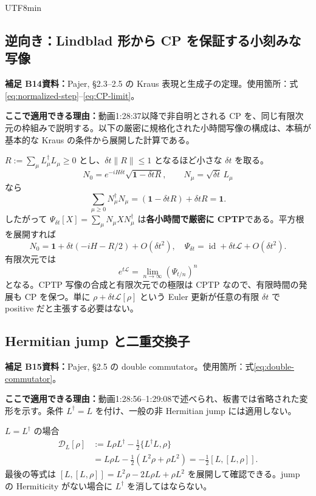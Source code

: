 \documentclass[11pt,a4paper]{article}
\numberwithin{equation}{section}
\newcommand{\id}{\operatorname{id}}
\newcommand{\I}{\mathbf{1}}
\newcommand{\D}[1]{\mathcal D_{#1}}
\newcommand{\supp}[3]{\par\smallskip\noindent\textcolor{BrickRed}{\textbf{補足 #1}}\quad\textbf{資料：}#2\par\noindent\textbf{ここで適用できる理由：}#3\par}
\begin{document}
\begin{CJK*}{UTF8}{min}
\subsection{逆向き：Lindblad 形から CP を保証する小刻みな写像}
\supp{B14}{Pajer\cite{pajer}, §2.3--2.5 の Kraus 表現と生成子の定理。使用箇所：式\eqref{eq:normalized-step}--\eqref{eq:CP-limit}。}{動画1:28:37以降で非自明とされる CP を、同じ有限次元の枠組みで説明する。以下の厳密に規格化された小時間写像の構成は、本稿が基本的な Kraus の条件から展開した計算である。}
$R:=\sum_\mu L_\mu^\dagger L_\mu\geq0$ とし、$\delta t\|R\|\leq1$ となるほど小さな $\delta t$ を取る。
\begin{equation}
N_0=e^{-iH\delta t}\sqrt{\I-\delta t R},
\qquad N_\mu=\sqrt{\delta t}\,L_\mu
\label{eq:normalized-step}
\end{equation}
なら
\begin{equation}
\sum_{\mu\geq0}N_\mu^\dagger N_\mu
=(\I-\delta t R)+\delta t R=\I.
\end{equation}
したがって $\Psi_{\delta t}[X]=\sum_\mu N_\mu XN_\mu^\dagger$ は\textbf{各小時間で厳密に CPTP}である。平方根を展開すれば
\begin{equation}
N_0=\I+\delta t(-iH-R/2)+O(\delta t^2),
\quad\Psi_{\delta t}=\id+\delta t\mathcal L+O(\delta t^2).
\end{equation}
有限次元では
\begin{equation}
e^{t\mathcal L}=\lim_{n\to\infty}(\Psi_{t/n})^n
\label{eq:CP-limit}
\end{equation}
となる。CPTP 写像の合成と有限次元での極限は CPTP なので、有限時間の発展も CP を保つ。単に $\rho+\delta t\mathcal L[\rho]$ という Euler 更新が任意の有限 $\delta t$ で positive だと主張する必要はない。

\subsection{Hermitian jump と二重交換子}
\supp{B15}{Pajer\cite{pajer}, §2.5 の double commutator。使用箇所：式\eqref{eq:double-commutator}。}{動画1:28:56--1:29:08で述べられ、板書では省略された変形を示す。条件 $L^\dagger=L$ を付け、一般の非 Hermitian jump には適用しない。}
$L=L^\dagger$ の場合
\begin{align}
\D{L}[\rho]
&:=L\rho L^\dagger-\frac12\{L^\dagger L,\rho\}\nonumber\\
&=L\rho L-\frac12(L^2\rho+\rho L^2)
=-\frac12[L,[L,\rho]].
\label{eq:double-commutator}
\end{align}
最後の等式は $[L,[L,\rho]]=L^2\rho-2L\rho L+\rho L^2$ を展開して確認できる。jump の Hermiticity がない場合に $L^\dagger$ を消してはならない。


\end{CJK*}
\end{document}
